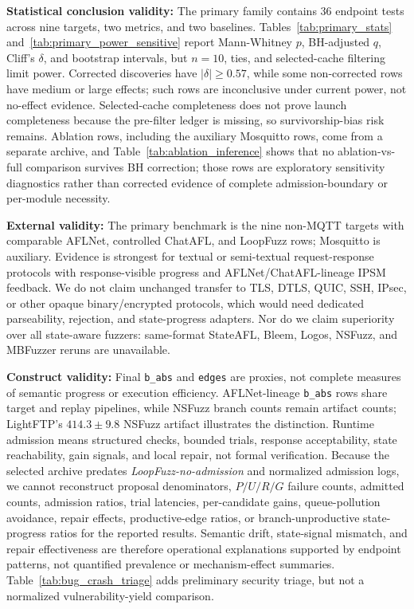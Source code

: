\documentclass[final,5p,times,number]{elsarticle}
\begin{document}
\textbf{Statistical conclusion validity:} The primary family contains 36 endpoint tests across nine targets, two metrics, and two baselines. Tables~\ref{tab:primary_stats} and~\ref{tab:primary_power_sensitive} report Mann-Whitney $p$, BH-adjusted $q$, Cliff's $\delta$, and bootstrap intervals, but $n=10$, ties, and selected-cache filtering limit power. Corrected discoveries have $|\delta|\ge0.57$, while some non-corrected rows have medium or large effects; such rows are inconclusive under current power, not no-effect evidence. Selected-cache completeness does not prove launch completeness because the pre-filter ledger is missing, so survivorship-bias risk remains. Ablation rows, including the auxiliary Mosquitto rows, come from a separate archive, and Table~\ref{tab:ablation_inference} shows that no ablation-vs-full comparison survives BH correction; those rows are exploratory sensitivity diagnostics rather than corrected evidence of complete admission-boundary or per-module necessity.

\textbf{External validity:} The primary benchmark is the nine non-MQTT targets with comparable AFLNet, controlled ChatAFL, and LoopFuzz rows; Mosquitto is auxiliary. Evidence is strongest for textual or semi-textual request-response protocols with response-visible progress and AFLNet/ChatAFL-lineage IPSM feedback. We do not claim unchanged transfer to TLS, DTLS, QUIC, SSH, IPsec, or other opaque binary/encrypted protocols, which would need dedicated parseability, rejection, and state-progress adapters. Nor do we claim superiority over all state-aware fuzzers: same-format StateAFL, Bleem, Logos, NSFuzz, and MBFuzzer reruns are unavailable.

\textbf{Construct validity:} Final \texttt{b\_abs} and \texttt{edges} are proxies, not complete measures of semantic progress or execution efficiency. AFLNet-lineage \texttt{b\_abs} rows share target and replay pipelines, while NSFuzz branch counts remain artifact counts; LightFTP's $414.3{\pm}9.8$ NSFuzz artifact illustrates the distinction. Runtime admission means structured checks, bounded trials, response acceptability, state reachability, gain signals, and local repair, not formal verification. Because the selected archive predates \emph{LoopFuzz-no-admission} and normalized admission logs, we cannot reconstruct proposal denominators, $P/U/R/G$ failure counts, admitted counts, admission ratios, trial latencies, per-candidate gains, queue-pollution avoidance, repair effects, productive-edge ratios, or branch-unproductive state-progress ratios for the reported results. Semantic drift, state-signal mismatch, and repair effectiveness are therefore operational explanations supported by endpoint patterns, not quantified prevalence or mechanism-effect summaries. Table~\ref{tab:bug_crash_triage} adds preliminary security triage, but not a normalized vulnerability-yield comparison.
\end{document}
